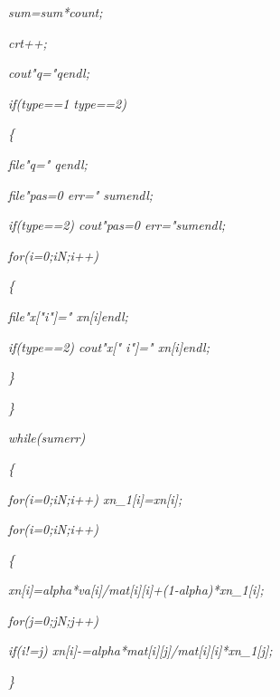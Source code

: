 \documentclass[a4paper,twoside]{book}
\begin{document}
\textit{\qquad sum=sum*count;}

\textit{\qquad crt++;}

\textit{\qquad cout\TEXTsymbol{<}\TEXTsymbol{<}"q="\TEXTsymbol{<}\TEXTsymbol{%
<}q\TEXTsymbol{<}\TEXTsymbol{<}endl;}

\textit{\qquad if(type==1 \TEXTsymbol{\vert}\TEXTsymbol{\vert} type==2)}

\textit{\qquad \{}

\textit{\qquad \qquad file\TEXTsymbol{<}\TEXTsymbol{<}"q="\TEXTsymbol{<}%
\TEXTsymbol{<}q\TEXTsymbol{<}\TEXTsymbol{<}endl;}

\textit{\qquad \qquad file\TEXTsymbol{<}\TEXTsymbol{<}"pas=0 err="%
\TEXTsymbol{<}\TEXTsymbol{<}sum\TEXTsymbol{<}\TEXTsymbol{<}endl;}

\textit{\qquad \qquad if(type==2) cout\TEXTsymbol{<}\TEXTsymbol{<}"pas=0
err="\TEXTsymbol{<}\TEXTsymbol{<}sum\TEXTsymbol{<}\TEXTsymbol{<}endl;}

\textit{\qquad \qquad for(i=0;i\TEXTsymbol{<}N;i++)}

\textit{\qquad \qquad \{}

\textit{\qquad \qquad \qquad file\TEXTsymbol{<}\TEXTsymbol{<}"x["\TEXTsymbol{%
<}\TEXTsymbol{<}i\TEXTsymbol{<}\TEXTsymbol{<}"]="\TEXTsymbol{<}\TEXTsymbol{<}%
xn[i]\TEXTsymbol{<}\TEXTsymbol{<}endl;}

\textit{\qquad \qquad \qquad if(type==2) cout\TEXTsymbol{<}\TEXTsymbol{<}"x["%
\TEXTsymbol{<}\TEXTsymbol{<}i\TEXTsymbol{<}\TEXTsymbol{<}"]="\TEXTsymbol{<}%
\TEXTsymbol{<}xn[i]\TEXTsymbol{<}\TEXTsymbol{<}endl;}

\textit{\qquad \qquad \}}

\textit{\qquad \}}

\textit{\qquad while(sum\TEXTsymbol{>}err)}

\textit{\qquad \{}

\textit{\qquad \qquad for(i=0;i\TEXTsymbol{<}N;i++) xn\_1[i]=xn[i];}

\textit{\qquad \qquad for(i=0;i\TEXTsymbol{<}N;i++)}

\textit{\qquad \qquad \{}

\textit{\qquad \qquad \qquad xn[i]=alpha*va[i]/mat[i][i]+(1-alpha)*xn\_1[i];}

\textit{\qquad \qquad \qquad for(j=0;j\TEXTsymbol{<}N;j++)}

\textit{\qquad \qquad \qquad \qquad if(i!=j)
xn[i]-=alpha*mat[i][j]/mat[i][i]*xn\_1[j];}

\textit{\qquad \qquad \}}
\end{document}
